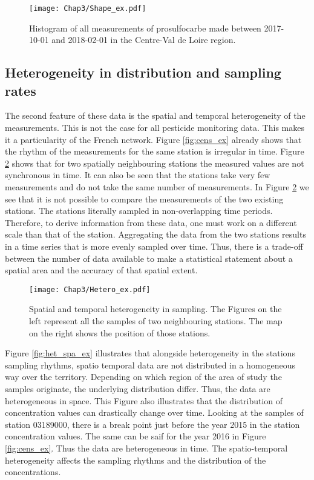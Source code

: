 \begin{figure}[ht]
    \centering
    \texttt{[image: Chap3/Shape\_ex.pdf]}
    \caption{Histogram of all measurements of prosulfocarbe made between 2017-10-01 and 2018-02-01 in the Centre-Val de Loire region.}
    \label{fig:shape_ex}
\end{figure}

\subsection{Heterogeneity in distribution and sampling rates}

The second feature of these data is the spatial and temporal heterogeneity of the measurements. This is not the case for all pesticide monitoring data. This makes it a particularity of the French network. Figure \ref{fig:cens_ex} already shows that the rhythm of the measurements for the same station is irregular in time. Figure \ref{fig:het_samp_ex} shows that for two spatially neighbouring stations the measured values are not synchronous in time. It can also be seen that the stations take very few measurements and do not take the same number of measurements. In Figure \ref{fig:het_samp_ex} we see that it is not possible to compare the measurements of the two existing stations. The stations literally sampled in non-overlapping time periods. Therefore, to derive information from these data, one must work on a different scale than that of the station. Aggregating the data from the two stations results in a time series that is more evenly sampled over time. Thus, there is a trade-off between the number of data available to make a statistical statement about a spatial area and the accuracy of that spatial extent. 

\begin{figure}[ht]
    \centering
    \texttt{[image: Chap3/Hetero\_ex.pdf]}
    \caption{Spatial and temporal heterogeneity in sampling. The Figures on the left represent all the samples of two neighbouring stations. The map on the right shows the position of those stations.}
    \label{fig:het_samp_ex}
\end{figure}

Figure \ref{fig:het_spa_ex} illustrates that alongside heterogeneity in the stations sampling rhythms, spatio temporal data are not distributed in a homogeneous way over the territory. Depending on which region of the area of study the samples originate, the underlying distribution differ. Thus, the data are heterogeneous in space. This Figure also illustrates that the distribution of concentration values can drastically change over time. Looking at the samples of station 03189000, there is a break point just before the year 2015 in the station concentration values. The same can be saif for the year 2016 in Figure \ref{fig:cens_ex}. Thus the data are heterogeneous in time. The spatio-temporal heterogeneity affects the sampling rhythms and the distribution of the concentrations. 

